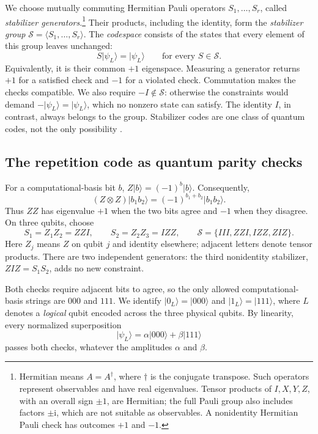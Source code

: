 \documentclass[11pt,a4paper]{article}
\newcommand{\ket}[1]{\lvert #1\rangle}
\newcommand{\ii}{\mathrm{i}}
\begin{document}
We choose mutually commuting Hermitian Pauli operators \(S_1,\ldots,S_r\), called \emph{stabilizer generators}.\footnote{Hermitian means \(A=A^\dagger\), where \(\dagger\) is the conjugate transpose. Such operators represent observables and have real eigenvalues. Tensor products of \(I,X,Y,Z\), with an overall sign \(\pm1\), are Hermitian; the full Pauli group also includes factors \(\pm\ii\), which are not suitable as observables. A nonidentity Hermitian Pauli check has outcomes \(+1\) and \(-1\).}
Their products, including the identity, form the \emph{stabilizer group} \(\mathcal S=\langle S_1,\ldots,S_r\rangle\).
The \emph{codespace} consists of the states that every element of this group leaves unchanged:
\begin{equation}\label{eq:codespace}
S\ket{\psi_L}=\ket{\psi_L}\qquad\text{for every }S\in\mathcal S.
\end{equation}
Equivalently, it is their common \(+1\) eigenspace. Measuring a generator returns \(+1\) for a satisfied check and \(-1\) for a violated check. Commutation makes the checks compatible. We also require \(-I\notin\mathcal S\): otherwise the constraints would demand \(-\ket{\psi_L}=\ket{\psi_L}\), which no nonzero state can satisfy. The identity \(I\), in contrast, always belongs to the group. Stabilizer codes are one class of quantum codes, not the only possibility \cite{ibm-stabilizers}.

\subsection{The repetition code as quantum parity checks}
For a computational-basis bit \(b\), \(Z\ket b=(-1)^b\ket b\). Consequently,
\begin{equation}
(Z\otimes Z)\ket{b_1b_2}=(-1)^{b_1+b_2}\ket{b_1b_2}.
\end{equation}
Thus \(ZZ\) has eigenvalue \(+1\) when the two bits agree and \(-1\) when they disagree. On three qubits, choose
\begin{equation}\label{eq:generators}
S_1=Z_1Z_2=ZZI,\qquad S_2=Z_2Z_3=IZZ,\qquad
\mathcal S=\{III,ZZI,IZZ,ZIZ\}.
\end{equation}
Here \(Z_j\) means \(Z\) on qubit \(j\) and identity elsewhere; adjacent letters denote tensor products. There are two independent generators: the third nonidentity stabilizer, \(ZIZ=S_1S_2\), adds no new constraint.

Both checks require adjacent bits to agree, so the only allowed computational-basis strings are \(000\) and \(111\). We identify \(\ket{0_L}=\ket{000}\) and \(\ket{1_L}=\ket{111}\), where \(L\) denotes a \emph{logical} qubit encoded across the three physical qubits. By linearity, every normalized superposition
\begin{equation}\label{eq:logical-basis}
\ket{\psi_L}=\alpha\ket{000}+\beta\ket{111}
\end{equation}
passes both checks, whatever the amplitudes \(\alpha\) and \(\beta\).
\end{document}
